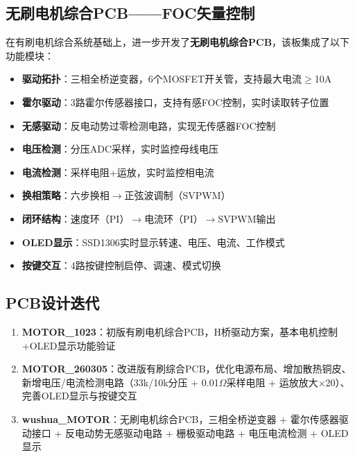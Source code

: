 \documentclass[12pt,a4paper]{ctexart}
\begin{document}
\subsection{无刷电机综合PCB——FOC矢量控制}

在有刷电机综合系统基础上，进一步开发了\textbf{无刷电机综合PCB}，该板集成了以下功能模块：

\begin{itemize}
    \item \textbf{驱动拓扑}：三相全桥逆变器，6个MOSFET开关管，支持最大电流$\geq$10A
    \item \textbf{霍尔驱动}：3路霍尔传感器接口，支持有感FOC控制，实时读取转子位置
    \item \textbf{无感驱动}：反电动势过零检测电路，实现无传感器FOC控制
    \item \textbf{电压检测}：分压ADC采样，实时监控母线电压
    \item \textbf{电流检测}：采样电阻+运放，实时监控相电流
    \item \textbf{换相策略}：六步换相$\to$正弦波调制（SVPWM）
    \item \textbf{闭环结构}：速度环（PI）$\to$电流环（PI）$\to$SVPWM输出
    \item \textbf{OLED显示}：SSD1306实时显示转速、电压、电流、工作模式
    \item \textbf{按键交互}：4路按键控制启停、调速、模式切换
\end{itemize}

\subsection{PCB设计迭代}

\begin{iterbox}[PCB版本迭代]
\begin{enumerate}[label=\textbf{Rev.\arabic*}:, leftmargin=3.5em]
    \item \textbf{MOTOR\_1023}：初版有刷电机综合PCB，H桥驱动方案，基本电机控制+OLED显示功能验证
    \item \textbf{MOTOR\_260305}：改进版有刷综合PCB，优化电源布局、增加散热铜皮、新增电压/电流检测电路（33k/10k分压 + 0.01$\Omega$采样电阻 + 运放放大×20）、完善OLED显示与按键交互
    \item \textbf{wushua\_MOTOR}：无刷电机综合PCB，三相全桥逆变器 + 霍尔传感器驱动接口 + 反电动势无感驱动电路 + 栅极驱动电路 + 电压电流检测 + OLED显示
\end{enumerate}
\end{iterbox}
\end{document}
